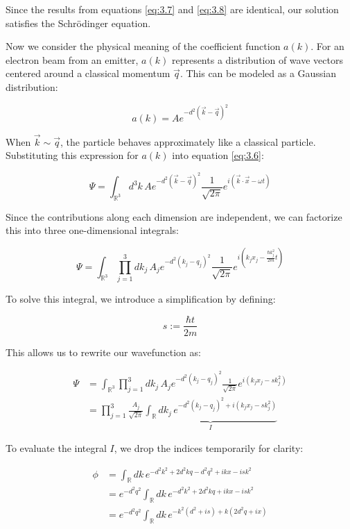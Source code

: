 \documentclass[italian]{HKNdocument}
\begin{document}
Since the results from equations \eqref{eq:3.7} and \eqref{eq:3.8} are identical, our solution satisfies the Schrödinger equation.

Now we consider the physical meaning of the coefficient function $a(k)$. For an electron beam from an emitter, $a(k)$ represents a distribution of wave vectors centered around a classical momentum $\vec{q}$. This can be modeled as a Gaussian distribution:

\begin{equation}
a(k) = Ae^{-d^2(\vec{k}-\vec{q})^2} \label{eq:3.9}
\end{equation}

When $\vec{k} \sim \vec{q}$, the particle behaves approximately like a classical particle. Substituting this expression for $a(k)$ into equation \eqref{eq:3.6}:

\begin{equation}
\Psi = \int_{\mathbb{R}^3}d^3k\,Ae^{-d^2(\vec{k}-\vec{q})^2}\frac{1}{\sqrt{2\pi}}e^{i(\vec{k}\cdot\vec{x}-\omega t)} \label{eq:3.10}
\end{equation}

Since the contributions along each dimension are independent, we can factorize this into three one-dimensional integrals:

\begin{equation}
\Psi = \int_{\mathbb{R}^3}\prod_{j=1}^3 dk_j\,A_je^{-d^2(k_j-q_j)^2}\frac{1}{\sqrt{2\pi}}e^{i(k_jx_j-\frac{\hbar k_j^2}{2m}t)} \label{eq:3.11}
\end{equation}


To solve this integral, we introduce a simplification by defining:

\begin{equation}
s := \frac{\hbar t}{2m} \label{eq:3.12}
\end{equation}

This allows us to rewrite our wavefunction as:

\begin{align}
\Psi &= \int_{\mathbb{R}^3}\prod_{j=1}^3dk_j\,A_je^{-d^2(k_j-q_j)^2}\frac{1}{\sqrt{2\pi}}e^{i(k_jx_j-sk_j^2)} \\
&= \prod_{j=1}^3\frac{A_j}{\sqrt{2\pi}}\underbrace{\int_{\mathbb{R}}dk_j\,e^{-d^2(k_j-q_j)^2+i(k_jx_j-sk_j^2)}}_{I} \label{eq:3.13}
\end{align}

To evaluate the integral $I$, we drop the indices temporarily for clarity:

\begin{align}
\phi &= \int_{\mathbb{R}}dk\,e^{-d^2k^2+2d^2kq-d^2q^2+ikx-isk^2} \\
&= e^{-d^2q^2}\int_{\mathbb{R}}dk\,e^{-d^2k^2+2d^2kq+ikx-isk^2} \label{eq:3.14} \\
&= e^{-d^2q^2}\int_{\mathbb{R}}dk\,e^{-k^2(d^2+is)+k(2d^2q+ix)}
\end{align}
\end{document}
